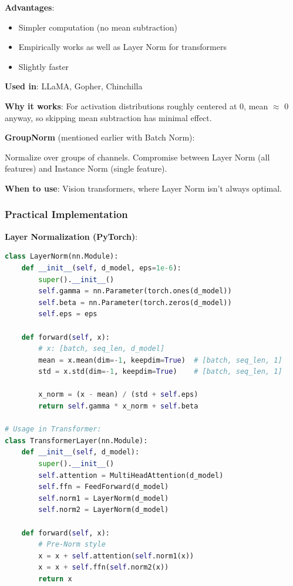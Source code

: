 \textbf{Advantages}:
\begin{itemize}
\item Simpler computation (no mean subtraction)
\item Empirically works as well as Layer Norm for transformers
\item Slightly faster
\end{itemize}

\textbf{Used in}: LLaMA, Gopher, Chinchilla

\textbf{Why it works}: For activation distributions roughly centered at 0, mean $\approx$ 0 anyway, so skipping mean subtraction has minimal effect.

\textbf{GroupNorm} (mentioned earlier with Batch Norm):

Normalize over groups of channels. Compromise between Layer Norm (all features) and Instance Norm (single feature).

\textbf{When to use}: Vision transformers, where Layer Norm isn't always optimal.

\subsubsection{Practical Implementation}

\textbf{Layer Normalization (PyTorch)}:
\begin{lstlisting}[language=Python]
class LayerNorm(nn.Module):
    def __init__(self, d_model, eps=1e-6):
        super().__init__()
        self.gamma = nn.Parameter(torch.ones(d_model))
        self.beta = nn.Parameter(torch.zeros(d_model))
        self.eps = eps

    def forward(self, x):
        # x: [batch, seq_len, d_model]
        mean = x.mean(dim=-1, keepdim=True)  # [batch, seq_len, 1]
        std = x.std(dim=-1, keepdim=True)    # [batch, seq_len, 1]

        x_norm = (x - mean) / (std + self.eps)
        return self.gamma * x_norm + self.beta

# Usage in Transformer:
class TransformerLayer(nn.Module):
    def __init__(self, d_model):
        super().__init__()
        self.attention = MultiHeadAttention(d_model)
        self.ffn = FeedForward(d_model)
        self.norm1 = LayerNorm(d_model)
        self.norm2 = LayerNorm(d_model)

    def forward(self, x):
        # Pre-Norm style
        x = x + self.attention(self.norm1(x))
        x = x + self.ffn(self.norm2(x))
        return x
\end{lstlisting}

